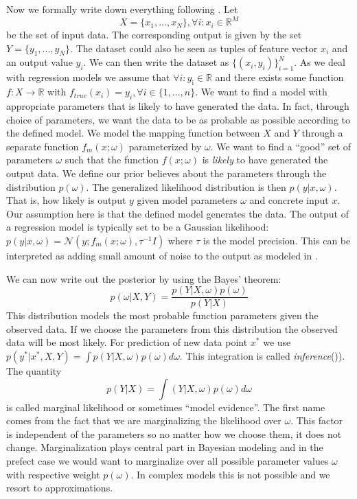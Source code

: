 \documentclass[12pt,a4paper,twoside]{scrartcl}
\numberwithin{equation}{section}
\begin{document}
Now we formally write down everything following \cite{gal2016}. Let
\begin{equation}
  X = \{x_1,..., x_N\}, \forall i : x_i\in\mathbb{R}^M
\end{equation}
be the set of input data. The corresponding output is  given by the set \(Y = \{y_1,..., y_N\}\). The dataset could also be seen as tuples of feature vector \(x_i\) and an output value \(y_i\). We can then write the dataset as \(\{ (x_i,y_i)\}_{i=1}^N \). As we deal with regression models we assume that  \(\forall i : y_{\text{i}}\in \mathbb{R}\) and there exists some function \(f:X \rightarrow\mathbb{R}\) with \(f_{true}(x_i)=y_i, \forall i \in\{1,..., n\}\). We want to find a model with appropriate parameters that is likely to have generated the data. In fact, through choice of parameters, we want the data to be as probable as possible according to the defined model. We model the mapping function between \(X\) and \(Y\) through a separate function \(f_m(x; \omega)\) parameterized by \(\omega\). We want to find a ``good'' set of parameters \(\omega\) such that the function \(f(x;\omega)\) is \emph{likely} to have generated the output data. We define our prior believes about the parameters through the distribution  \(p(\omega )\). The generalized likelihood distribution is then  \(p(y|x, \omega)\). That is, how likely is output \(y\) given  model parameters \(\omega\) and concrete input \(x\). Our assumption here is that the defined model generates the data. The output of a regression model is typically set to be a  Gaussian likelihood: \(p(y|x,\omega)=\mathcal{N}(y; f_m(x;\omega), \tau^{-1}I)\) where \(\tau\) is the  model precision. This can be interpreted as adding small amount of noise to the output as modeled in \cite{gal2016}.

We can now  write out the posterior by using the Bayes' theorem:
\begin{equation}
p(\omega|X,Y) = \frac{p(Y|X, \omega)p(\omega)}{p(Y|X)}
\end{equation}
This distribution models the most probable function parameters given the observed data. If we choose the parameters from this distribution the observed data will be most likely. For prediction of new data point \(x^*\) we use  \(p(y^{\text{*}}|x^{\text{*}},X,Y) = \int p(Y|X, \omega)p(\omega)d \omega\). This integration is called \emph{inference}(\cite{gal2016})). The quantity
\begin{equation}
 p(Y|X) = \int (Y|X, \omega)p( \omega )d \omega
\end{equation}
is called marginal likelihood or sometimes ``model evidence''. The first name comes from the fact that we are marginalizing the likelihood over \(\omega\). This factor is independent of the parameters so no matter how we choose them, it does not change. Marginalization plays central part in Bayesian modeling and in the prefect case we would want to marginalize over all possible parameter values  \(\omega\) with respective weight \(p(\omega)\). In complex models this is not possible and we resort to approximations.
\end{document}
